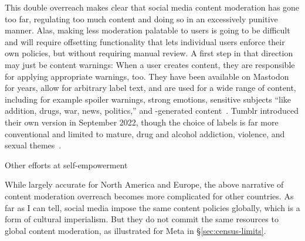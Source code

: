 

This double overreach makes clear that social media content moderation has gone
too far, regulating too much content and doing so in an excessively punitive
manner. Alas, making less moderation palatable to users is going to be difficult
and will require offsetting functionality that lets individual users enforce
their own policies, but without requiring manual review. A first step in that
direction may just be content warnings: When a user creates content, they are
responsible for applying appropriate warnings, too. They have been available on
Mastodon for years, allow for arbitrary label text, and are used for a wide
range of content, including for example spoiler warnings, strong emotions,
sensitive subjects ``like addition, drugs, war, news, politics,'' and
\AI-generated content~\cite{Maloki2022,Sheehan2022,Voit2022}. Tumblr introduced
their own version in September 2022, though the choice of labels is far more
conventional and limited to mature, drug and alcohol addiction, violence, and
sexual themes~\cite{Tumblr2022}.

Other efforts at
self-empowerment~\cite{AngelidouSmith2021,Goodman2021,Hern2021,Instagram2021}

While largely accurate for North America and Europe, the above narrative of
content moderation overreach becomes more complicated for other countries. As
far as I can tell, social media impose the same content policies globally, which
is a form of cultural imperialism. But they do not commit the same resources to
global content moderation, as illustrated for Meta in \S\ref{sec:census-limits}.






